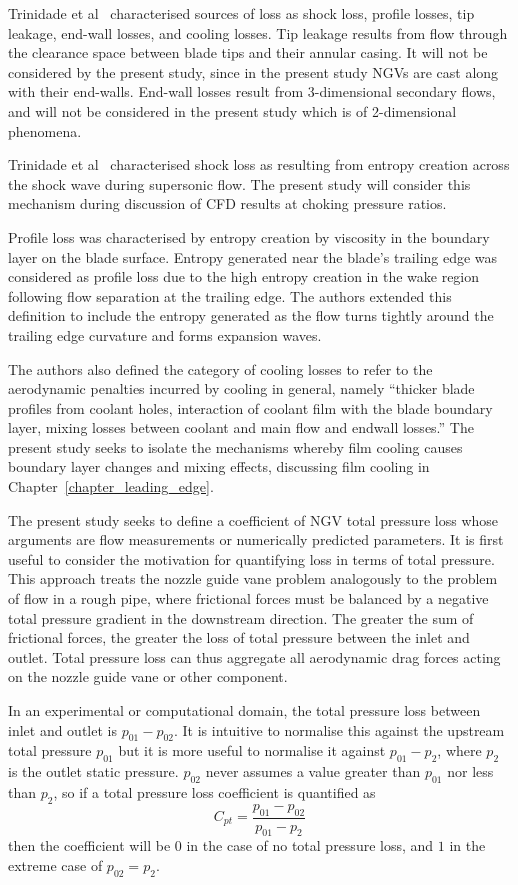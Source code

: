 \documentclass[a4paper, 11pt, oneside]{report}
\begin{document}
Trinidade et al~\cite{trinidade_loss} characterised sources of loss as shock loss, profile losses, tip leakage, end-wall losses, and cooling losses. Tip leakage results from flow through the clearance space between blade tips and their annular casing. It will not be considered by the present study, since in the present study NGVs are cast along with their end-walls. End-wall losses result from 3-dimensional secondary flows, and will not be considered in the present study which is of 2-dimensional phenomena.

Trinidade et al~\cite{trinidade_loss} characterised shock loss as resulting from entropy creation across the shock wave during supersonic flow. The present study will consider this mechanism during discussion of CFD results at choking pressure ratios.

Profile loss was characterised by entropy creation by viscosity in the boundary layer on the blade surface. Entropy generated near the blade's trailing edge was considered as profile loss due to the high entropy creation in the wake region following flow separation at the trailing edge. The authors extended this definition to include the entropy generated as the flow turns tightly around the trailing edge curvature and forms expansion waves.

The authors also defined the category of cooling losses to refer to the aerodynamic penalties incurred by cooling in general, namely ``thicker blade profiles from coolant holes, interaction of coolant film with the blade boundary layer, mixing losses between coolant and main flow and endwall losses.'' The present study seeks to isolate the mechanisms whereby film cooling causes boundary layer changes and mixing effects, discussing film cooling in Chapter~\ref{chapter_leading_edge}.

The present study seeks to define a coefficient of NGV total pressure loss whose arguments are flow measurements or numerically predicted parameters. It is first useful to consider the motivation for quantifying loss in terms of total pressure. This approach treats the nozzle guide vane problem analogously to the problem of flow in a rough pipe, where frictional forces must be balanced by a negative total pressure gradient in the downstream direction. The greater the sum of frictional forces, the greater the loss of total pressure between the inlet and outlet. Total pressure loss can thus aggregate all aerodynamic drag forces acting on the nozzle guide vane or other component.

In an experimental or computational domain, the total pressure loss between inlet and outlet is $p_{01} - p_{02}$. It is intuitive to normalise this against the upstream total pressure $p_{01}$ but it is more useful to normalise it against $p_{01} - p_2$, where $p_2$ is the outlet static pressure. $p_{02}$ never assumes a value greater than $p_{01}$ nor less than $p_2$, so if a total pressure loss coefficient is quantified as
\begin{equation}\label{total_pressure_loss_coefficient}
C_{pt} = \frac{
p_{01} - p_{02}
}{
p_{01} - p_2
}
\end{equation}
then the coefficient will be $0$ in the case of no total pressure loss, and $1$ in the extreme case of $p_{02} = p_2$.
\end{document}
